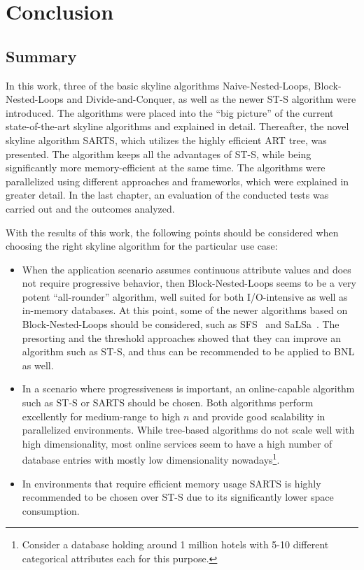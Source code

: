 \chapter{Conclusion}
\label{chapter:Conclusion}

\section{Summary}
In this work, three of the basic skyline algorithms Naive-Nested-Loops, Block-Nested-Loops and Divide-and-Conquer, as well as the newer ST-S algorithm were introduced. The algorithms were placed into the ``big picture'' of the current state-of-the-art skyline algorithms and explained in detail. Thereafter, the novel skyline algorithm SARTS, which utilizes the highly efficient ART tree, was presented. The algorithm keeps all the advantages of ST-S, while being significantly more memory-efficient at the same time. The algorithms were parallelized using different approaches and frameworks, which were explained in greater detail. In the last chapter, an evaluation of the conducted tests was carried out and the outcomes analyzed. 

With the results of this work, the following points should be considered when choosing the right skyline algorithm for the particular use case: 
\begin{itemize}
	\item When the application scenario assumes continuous attribute values and does not require progressive behavior, then Block-Nested-Loops seems to be a very potent ``all-rounder'' algorithm, well suited for both I/O-intensive as well as in-memory databases. At this point, some of the newer algorithms based on Block-Nested-Loops should be considered, such as SFS~\cite{sfs} and SaLSa~\cite{salsa}. The presorting and the threshold approaches showed that they can improve an algorithm such as ST-S, and thus can be recommended to be applied to BNL as well. 
	\item In a scenario where progressiveness is important, an online-capable algorithm such as ST-S or SARTS should be chosen. Both algorithms perform excellently for medium-range to high $n$ and provide good scalability in parallelized environments. While tree-based algorithms do not scale well with high dimensionality, most online services seem to have a high number of database entries with mostly low dimensionality nowadays\footnote{Consider a database holding around 1 million hotels with 5-10 different categorical attributes each for this purpose.}.
	\item In environments that require efficient memory usage SARTS is highly recommended to be chosen over ST-S due to its significantly lower space consumption. 
\end{itemize}

